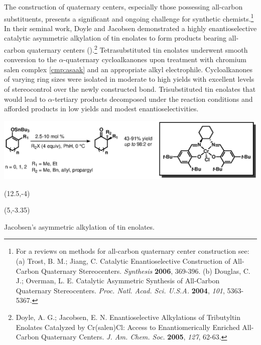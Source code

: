  The construction of quaternary centers, especially those possessing all-carbon
 substituents, presents a significant and ongoing challenge for synthetic
 chemists.\footnote{For a reviews on methods for all-carbon quaternary center construction see: (a)
 {\frenchspacing Trost, B. M.; Jiang, C. Catalytic Enantioselective Construction of All-Carbon
 Quaternary Stereocenters. \textit{Synthesis} \textbf{2006}, 369-396.} (b) {\frenchspacing Douglas,
 C.
 J.; Overman, L.
 E.
 Catalytic Asymmetric Synthesis of All-Carbon Quaternary Stereocenters. \textit{Proc. Natl. Acad.
 Sci. U.S.A.} \textbf{2004}, \textit{101}, 5363-5367.}} In their seminal work, Doyle and Jacobsen
 demonstrated a highly enantioselective catalytic asymmetric alkylation of tin enolates to form
 products bearing all-carbon quaternary centers
 ().\footnote{{\frenchspacing Doyle, A.
 G.; Jacobsen, E.
 N.
 Enantioselective Alkylations of Tributyltin Enolates Catalyzed by Cr(salen)Cl: Access to Enantiomerically Enriched
 All-Carbon Quaternary Centers. \textit{J. Am. Chem. Soc.} \textbf{2005}, \textit{127}, 62-63.}}
 Tetrasubstituted tin enolates underwent smooth conversion to the $\alpha$-quaternary cycloalkanones
 upon treatment with chromium salen complex \ref{cmp:asaak} and an appropriate alkyl electrophile.
 Cycloalkanones of varying ring sizes were isolated in moderate to high yields with excellent levels of stereocontrol over the newly constructed  bond. Trisubstituted tin
 enolates that would lead to $\alpha$-tertiary products decomposed under the reaction conditions and
 afforded products in low yields and modest enantioselectivities.
  \begin{Scheme}[h]
  \centering
  \includegraphics[scale=0.8]{chp_asymmetric/images/jacobsentin}
   \begin{textblock}{1}(12.5,-4)  \end{textblock}
  \begin{textblock}{1}(5,-3.35)  \end{textblock}
  \caption{Jacobsen's asymmetric alkylation of tin enolates.}
  \label{sch:asjacobsentin}
\end{Scheme}   
 

